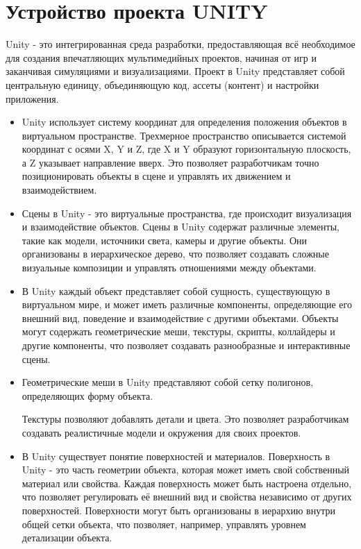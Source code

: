 \documentclass[a4paper,12pt]{article}
\begin{document}
	\newpage
	\section{Устройство проекта UNITY}
	
		 Unity - это интегрированная среда разработки, предоставляющая всё необходимое для создания впечатляющих мультимедийных проектов, начиная от игр и заканчивая симуляциями и визуализациями. Проект в Unity представляет собой центральную единицу, объединяющую код, ассеты (контент) и настройки приложения.
	
	\begin{itemize}
		
	

	
	\item Unity использует систему координат для определения положения объектов в виртуальном пространстве. Трехмерное пространство описывается системой координат с осями X, Y и Z, где X и Y образуют горизонтальную плоскость, а Z указывает направление вверх. Это позволяет разработчикам точно позиционировать объекты в сцене и управлять их движением и взаимодействием.
	
	\item Сцены в Unity - это виртуальные пространства, где происходит визуализация и взаимодействие объектов. Сцены в Unity содержат различные элементы, такие как модели, источники света, камеры и другие объекты. Они организованы в иерархическое дерево, что позволяет создавать сложные визуальные композиции и управлять отношениями между объектами.
	
\item В Unity каждый объект представляет собой сущность, существующую в виртуальном мире, и может иметь различные компоненты, определяющие его внешний вид, поведение и взаимодействие с другими объектами. Объекты могут содержать геометрические меши, текстуры, скрипты, коллайдеры и другие компоненты, что позволяет создавать разнообразные и интерактивные сцены.
	
\item 	Геометрические меши в Unity представляют собой сетку полигонов, определяющих форму объекта.

Текстуры позволяют добавлять детали и цвета. Это позволяет разработчикам создавать реалистичные модели и окружения для своих проектов.
	
\item 	В Unity существует понятие поверхностей и материалов. Поверхность в Unity - это часть геометрии объекта, которая может иметь свой собственный материал или свойства. Каждая поверхность может быть настроена отдельно, что позволяет регулировать её внешний вид и свойства независимо от других поверхностей. Поверхности могут быть организованы в иерархию внутри общей сетки объекта, что позволяет, например, управлять уровнем детализации объекта.
	

\end{itemize}
\end{document}
